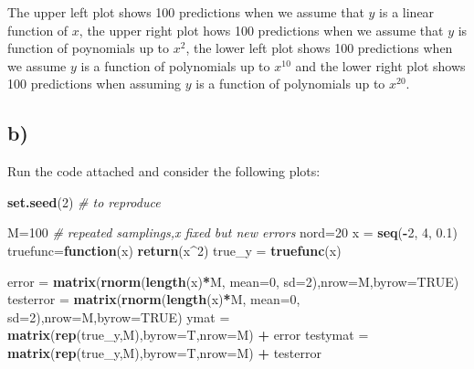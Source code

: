 \documentclass[]{article}
\newenvironment{Shaded}{\begin{snugshade}}{\end{snugshade}}
\newcommand{\KeywordTok}[1]{\textcolor[rgb]{0.13,0.29,0.53}{\textbf{#1}}}
\newcommand{\DataTypeTok}[1]{\textcolor[rgb]{0.13,0.29,0.53}{#1}}
\newcommand{\DecValTok}[1]{\textcolor[rgb]{0.00,0.00,0.81}{#1}}
\newcommand{\FloatTok}[1]{\textcolor[rgb]{0.00,0.00,0.81}{#1}}
\newcommand{\StringTok}[1]{\textcolor[rgb]{0.31,0.60,0.02}{#1}}
\newcommand{\CommentTok}[1]{\textcolor[rgb]{0.56,0.35,0.01}{\textit{#1}}}
\newcommand{\OtherTok}[1]{\textcolor[rgb]{0.56,0.35,0.01}{#1}}
\newcommand{\ControlFlowTok}[1]{\textcolor[rgb]{0.13,0.29,0.53}{\textbf{#1}}}
\newcommand{\OperatorTok}[1]{\textcolor[rgb]{0.81,0.36,0.00}{\textbf{#1}}}
\newcommand{\NormalTok}[1]{#1}
\begin{document}
The upper left plot shows 100 predictions when we assume that \(y\) is a
linear function of \(x\), the upper right plot hows 100 predictions when
we assume that \(y\) is function of poynomials up to \(x^2\), the lower
left plot shows 100 predictions when we assume \(y\) is a function of
polynomials up to \(x^{10}\) and the lower right plot shows 100
predictions when assuming \(y\) is a function of polynomials up to
\(x^{20}\).

\subsection{b)}\label{b}

Run the code attached and consider the following plots:

\begin{Shaded}
\begin{Highlighting}[]
\KeywordTok{set.seed}\NormalTok{(}\DecValTok{2}\NormalTok{) }\CommentTok{# to reproduce}

\NormalTok{M=}\DecValTok{100} \CommentTok{# repeated samplings,x fixed but new errors}
\NormalTok{nord=}\DecValTok{20}
\NormalTok{x =}\StringTok{ }\KeywordTok{seq}\NormalTok{(}\OperatorTok{-}\DecValTok{2}\NormalTok{, }\DecValTok{4}\NormalTok{, }\FloatTok{0.1}\NormalTok{)}
\NormalTok{truefunc=}\ControlFlowTok{function}\NormalTok{(x) }\KeywordTok{return}\NormalTok{(x}\OperatorTok{^}\DecValTok{2}\NormalTok{)}
\NormalTok{true_y =}\StringTok{ }\KeywordTok{truefunc}\NormalTok{(x)}

\NormalTok{error =}\StringTok{ }\KeywordTok{matrix}\NormalTok{(}\KeywordTok{rnorm}\NormalTok{(}\KeywordTok{length}\NormalTok{(x)}\OperatorTok{*}\NormalTok{M, }\DataTypeTok{mean=}\DecValTok{0}\NormalTok{, }\DataTypeTok{sd=}\DecValTok{2}\NormalTok{),}\DataTypeTok{nrow=}\NormalTok{M,}\DataTypeTok{byrow=}\OtherTok{TRUE}\NormalTok{)}
\NormalTok{testerror =}\StringTok{ }\KeywordTok{matrix}\NormalTok{(}\KeywordTok{rnorm}\NormalTok{(}\KeywordTok{length}\NormalTok{(x)}\OperatorTok{*}\NormalTok{M, }\DataTypeTok{mean=}\DecValTok{0}\NormalTok{, }\DataTypeTok{sd=}\DecValTok{2}\NormalTok{),}\DataTypeTok{nrow=}\NormalTok{M,}\DataTypeTok{byrow=}\OtherTok{TRUE}\NormalTok{)}
\NormalTok{ymat =}\StringTok{ }\KeywordTok{matrix}\NormalTok{(}\KeywordTok{rep}\NormalTok{(true_y,M),}\DataTypeTok{byrow=}\NormalTok{T,}\DataTypeTok{nrow=}\NormalTok{M) }\OperatorTok{+}\StringTok{ }\NormalTok{error}
\NormalTok{testymat =}\StringTok{ }\KeywordTok{matrix}\NormalTok{(}\KeywordTok{rep}\NormalTok{(true_y,M),}\DataTypeTok{byrow=}\NormalTok{T,}\DataTypeTok{nrow=}\NormalTok{M) }\OperatorTok{+}\StringTok{ }\NormalTok{testerror}


\end{Highlighting}
\end{Shaded}
\end{document}
